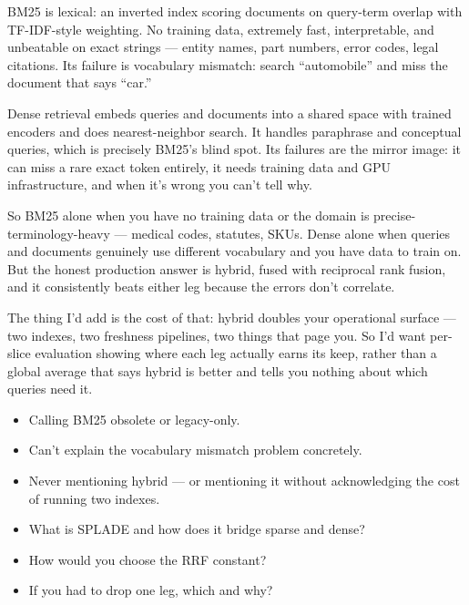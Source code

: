 \documentclass[10pt,twoside]{book}
\newcommand{\lab}[1]{\par\vspace{5pt}\noindent{\sffamily\footnotesize\bfseries\color{accent}#1}\par\vspace{1pt}}
\newcommand{\flab}[1]{\par\vspace{5pt}\noindent{\sffamily\footnotesize\bfseries\color{flag}#1}\par\vspace{1pt}}
\begin{document}
BM25 is lexical: an inverted index scoring documents on query-term overlap with TF-IDF-style weighting. No training data, extremely fast, interpretable, and unbeatable on exact strings --- entity names, part numbers, error codes, legal citations. Its failure is vocabulary mismatch: search ``automobile'' and miss the document that says ``car.''\par\vspace{3pt}
Dense retrieval embeds queries and documents into a shared space with trained encoders and does nearest-neighbor search. It handles paraphrase and conceptual queries, which is precisely BM25's blind spot. Its failures are the mirror image: it can miss a rare exact token entirely, it needs training data and GPU infrastructure, and when it's wrong you can't tell why.\par\vspace{3pt}
So BM25 alone when you have no training data or the domain is precise-terminology-heavy --- medical codes, statutes, SKUs. Dense alone when queries and documents genuinely use different vocabulary and you have data to train on. But the honest production answer is hybrid, fused with reciprocal rank fusion, and it consistently beats either leg because the errors don't correlate.\par\vspace{3pt}
The thing I'd add is the cost of that: hybrid doubles your operational surface --- two indexes, two freshness pipelines, two things that page you. So I'd want per-slice evaluation showing where each leg actually earns its keep, rather than a global average that says hybrid is better and tells you nothing about which queries need it.\par\vspace{3pt}
\flab{Loses the signal}
\begin{itemize}
\item Calling BM25 obsolete or legacy-only.
\item Can't explain the vocabulary mismatch problem concretely.
\item Never mentioning hybrid --- or mentioning it without acknowledging the cost of running two indexes.
\end{itemize}
\lab{Then they ask}
\begin{itemize}
\item What is SPLADE and how does it bridge sparse and dense?
\item How would you choose the RRF constant?
\item If you had to drop one leg, which and why?
\end{itemize}
\end{document}

